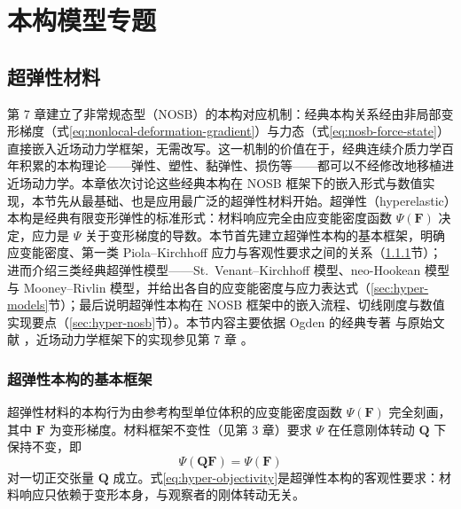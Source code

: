 \chapter{本构模型专题}

\section{超弹性材料}\label{sec:hyperelastic}

第 7 章建立了非常规态型（NOSB）的本构对应机制：经典本构关系经由非局部变形梯度（式\eqref{eq:nonlocal-deformation-gradient}）与力态（式\eqref{eq:nosb-force-state}）直接嵌入近场动力学框架，无需改写。这一机制的价值在于，经典连续介质力学百年积累的本构理论——弹性、塑性、黏弹性、损伤等——都可以不经修改地移植进近场动力学。本章依次讨论这些经典本构在 NOSB 框架下的嵌入形式与数值实现，本节先从最基础、也是应用最广泛的超弹性材料开始。超弹性（hyperelastic）本构是经典有限变形弹性的标准形式：材料响应完全由应变能密度函数 $\Psi(\mathbf{F})$ 决定，应力是 $\Psi$ 关于变形梯度的导数。本节首先建立超弹性本构的基本框架，明确应变能密度、第一类 Piola--Kirchhoff 应力与客观性要求之间的关系（\ref{sec:hyper-framework}节）；进而介绍三类经典超弹性模型——St.~Venant--Kirchhoff 模型、neo-Hookean 模型与 Mooney--Rivlin 模型，并给出各自的应变能密度与应力表达式（\ref{sec:hyper-models}节）；最后说明超弹性本构在 NOSB 框架中的嵌入流程、切线刚度与数值实现要点（\ref{sec:hyper-nosb}节）。本节内容主要依据 Ogden 的经典专著 \cite{Ogden1997} 与原始文献 \cite{Mooney1940,Rivlin1948,Ogden1972}，近场动力学框架下的实现参见第 7 章 \cite{Silling2007,Warren2009}。

\subsection{超弹性本构的基本框架}\label{sec:hyper-framework}

超弹性材料的本构行为由参考构型单位体积的应变能密度函数 $\Psi(\mathbf{F})$ 完全刻画，其中 $\mathbf{F}$ 为变形梯度。材料框架不变性（见第 3 章）要求 $\Psi$ 在任意刚体转动 $\mathbf{Q}$ 下保持不变，即
\begin{equation}
  \Psi(\mathbf{Q}\mathbf{F})=\Psi(\mathbf{F})
  \label{eq:hyper-objectivity}
\end{equation}
对一切正交张量 $\mathbf{Q}$ 成立。式\eqref{eq:hyper-objectivity}是超弹性本构的客观性要求：材料响应只依赖于变形本身，与观察者的刚体转动无关。

